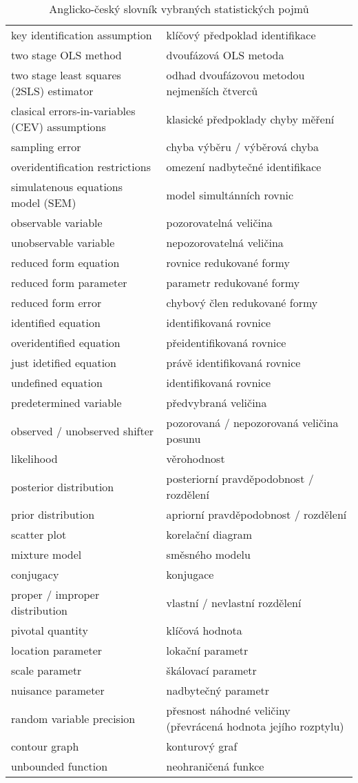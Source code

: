 \begin{table}
\begin{center}
\begin{tabular}{l l}
key identification assumption & klíčový předpoklad identifikace\\
two stage OLS method & dvoufázová OLS metoda\\
two stage least squares (2SLS) estimator & odhad dvoufázovou metodou nejmenších čtverců\\
clasical errors-in-variables (CEV) assumptions & klasické předpoklady chyby měření\\
sampling error & chyba výběru / výběrová chyba\\
overidentification restrictions & omezení nadbytečné identifikace\\
simulatenous equations model (SEM) & model simultánních rovnic\\
observable variable & pozorovatelná veličina\\
unobservable variable & nepozorovatelná veličina\\
reduced form equation & rovnice redukované formy\\
reduced form parameter & parametr redukované formy\\
reduced form error & chybový člen redukované formy\\
identified equation & identifikovaná rovnice\\
overidentified equation & přeidentifikovaná rovnice\\
just idetified equation & právě identifikovaná rovnice\\
undefined equation & identifikovaná rovnice\\
predetermined variable & předvybraná veličina\\
observed / unobserved shifter & pozorovaná / nepozorovaná veličina posunu\\
likelihood & věrohodnost\\
posterior distribution & posteriorní pravděpodobnost / rozdělení\\
prior distribution & apriorní pravděpodobnost / rozdělení\\
scatter plot & korelační diagram\\
mixture model & směsného modelu\\
conjugacy & konjugace\\
proper / improper distribution & vlastní / nevlastní rozdělení\\
pivotal quantity & klíčová hodnota\\
location parameter & lokační parametr\\
scale parametr & škálovací parametr\\
nuisance parameter & nadbytečný parametr\\
random variable precision & přesnost náhodné veličiny (převrácená hodnota jejího rozptylu)\\
contour graph & konturový graf\\
unbounded function & neohraničená funkce\\
\end{tabular}
\caption{Anglicko-český slovník vybraných statistických pojmů}
\end{center}
\end{table}
